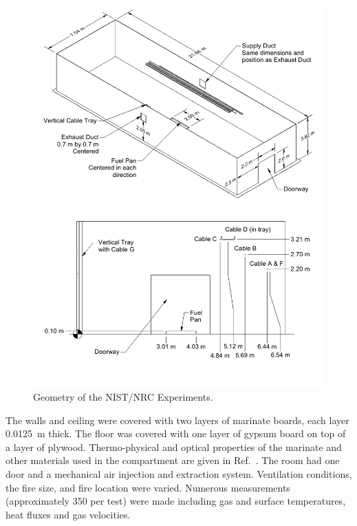 \begin{figure}[p]
\includegraphics[width=\textwidth]{FIGURES/NIST_NRC/NIST_NRC_Drawing}
\caption[Geometry of the NIST/NRC Experiments]{Geometry of the NIST/NRC Experiments.}
\label{NIST_NRC_Drawing}
\end{figure}

The walls and ceiling were covered with two layers of marinate boards, each layer 0.0125~m thick. The floor
was covered with one layer of gypsum board on top of a layer of plywood. Thermo-physical and optical properties of the marinate
and other materials used in the compartment are given in Ref.~\cite{Hamins:SP1013-1}. The room had one door and a mechanical air injection and extraction
system. Ventilation conditions, the fire size, and fire location were varied. Numerous measurements (approximately 350 per test) were made including
gas and surface temperatures, heat fluxes and gas velocities.

